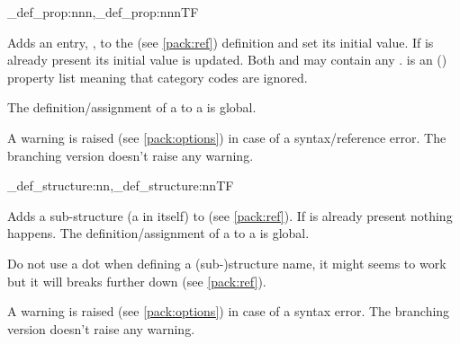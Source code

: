 \documentclass[10pt]{article}
\begin{document}
\begin{codedescribe}{\starray_def_prop:nnn,\starray_def_prop:nnnTF}
\begin{codesyntax}%
\end{codesyntax}
Adds an entry, , to the  (see \ref{pack:ref}) definition and set its initial value. If  is already present its initial value is updated. Both  and  may contain any .  is an () property list  meaning that category codes are ignored.

The definition/assignment of a  to a  is global.
\end{codedescribe}

\begin{tsremark}
A warning is raised (see \ref{pack:options}) in case of a  syntax/reference error. The branching version doesn't raise any warning.
\end{tsremark}

\begin{codedescribe}{\starray_def_structure:nn,\starray_def_structure:nnTF}
\begin{codesyntax}%
\end{codesyntax}
Adds a sub-structure (a  in itself) to  (see \ref{pack:ref}). If  is already present nothing happens. The definition/assignment of a  to a  is global.
\end{codedescribe}


\begin{tsremark}
Do not use a dot when defining a (sub-)structure name, it might seems to work but it will breaks further down (see \ref{pack:ref}).
\end{tsremark}


\begin{tsremark}[Note 2:]
A warning is raised (see \ref{pack:options}) in case of a  syntax error. The branching version doesn't raise any warning.
\end{tsremark}
\end{document}
